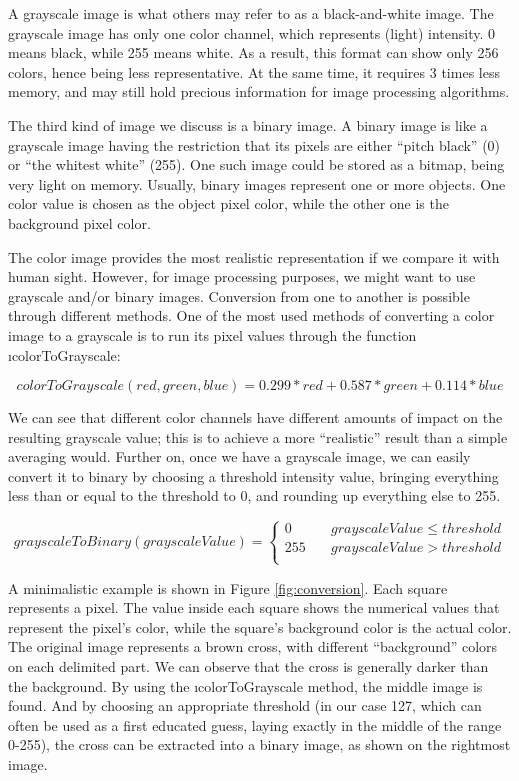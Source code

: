 A grayscale image is what others may refer to as a black-and-white image. The grayscale image has only one color channel, which represents (light) intensity. 0 means black, while 255 means white. As a result, this format can show only 256 colors, hence being less representative. At the same time, it requires 3 times less memory, and may still hold precious information for image processing algorithms.

The third kind of image we discuss is a binary image. A binary image is like a grayscale image having the restriction that its pixels are either ``pitch black'' (0) or ``the whitest white'' (255). One such image could be stored as a bitmap, being very light on memory. Usually, binary images represent one or more objects. One color value is chosen as the object pixel color, while the other one is the background pixel color.

The color image provides the most realistic representation if we compare it with human sight. However, for image processing purposes, we might want to use grayscale and/or binary images. Conversion from one to another is possible through different methods. One of the most used methods of converting a color image to a grayscale is to run its pixel values through the function \i{colorToGrayscale}:

\[
colorToGrayscale(red, green, blue) = 0.299 * red + 0.587 * green + 0.114 * blue
\]

We can see that different color channels have different amounts of impact on the resulting grayscale value; this is to achieve a more ``realistic'' result than a simple averaging would. Further on, once we have a grayscale image, we can easily convert it to binary by choosing a threshold intensity value, bringing everything less than or equal to the threshold to 0, and rounding up everything else to 255.

\[
grayscaleToBinary(grayscaleValue) =
\begin{cases}
    0 &\quad grayscaleValue \le threshold\\
    255 &\quad grayscaleValue > threshold\\
\end{cases}
\]

A minimalistic example is shown in Figure \ref{fig:conversion}. Each square represents a pixel. The value inside each square shows the numerical values that represent the pixel's color, while the square's background color is the actual color. The original image represents a brown cross, with different ``background'' colors on each delimited part. We can observe that the cross is generally darker than the background. By using the \i{colorToGrayscale} method, the middle image is found. And by choosing an appropriate threshold (in our case 127, which can often be used as a first educated guess, laying exactly in the middle of the range 0-255), the cross can be extracted into a binary image, as shown on the rightmost image.

